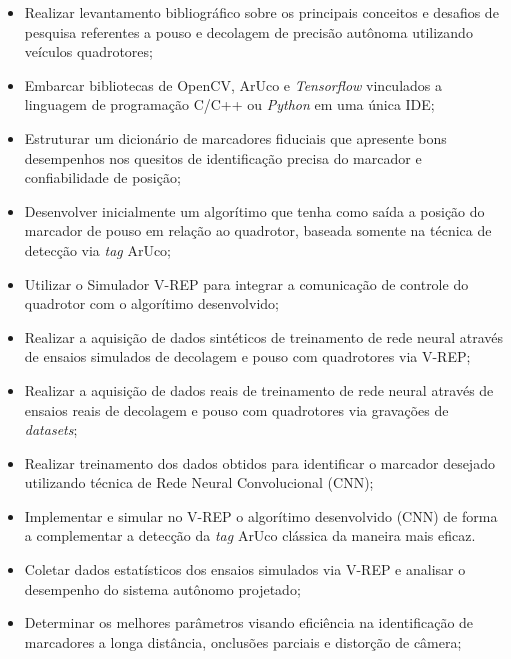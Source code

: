 \begin{itemize}
  \item Realizar levantamento bibliográfico sobre os principais conceitos e desafios de pesquisa referentes a pouso e decolagem de precisão autônoma utilizando veículos quadrotores;
  
  \item Embarcar bibliotecas de OpenCV, ArUco e \textit{Tensorflow}  vinculados a linguagem de programação C/C++ ou \textit{Python} em uma única IDE;
  
  \item Estruturar um dicionário de marcadores fiduciais que apresente bons desempenhos nos quesitos de identificação precisa do marcador e confiabilidade de posição;
  
  \item Desenvolver inicialmente um algorítimo que tenha como saída a posição do marcador de pouso em relação ao quadrotor, baseada somente na técnica de detecção via \textit{tag} ArUco;
  
  \item Utilizar o Simulador V-REP para integrar a comunicação de controle do quadrotor com o algorítimo desenvolvido;
  
   \item Realizar a aquisição de dados sintéticos de treinamento de rede neural através de ensaios simulados de decolagem e pouso com quadrotores via V-REP;
  
  \item Realizar a aquisição de dados reais de treinamento de rede neural através de ensaios reais de decolagem e pouso com quadrotores via gravações de \textit{datasets};
   
   \item  Realizar treinamento dos dados obtidos para identificar o marcador desejado utilizando técnica de Rede Neural Convolucional (CNN);
   
   \item Implementar e simular no V-REP o algorítimo desenvolvido (CNN) de forma a complementar a detecção da \textit{tag} ArUco clássica da maneira mais eficaz.
   
   \item Coletar dados estatísticos dos ensaios simulados via V-REP e analisar o desempenho do sistema autônomo projetado;
   
    \item Determinar os melhores parâmetros visando eficiência na identificação de marcadores a longa distância, onclusões parciais e distorção de câmera;
    
\end{itemize}

